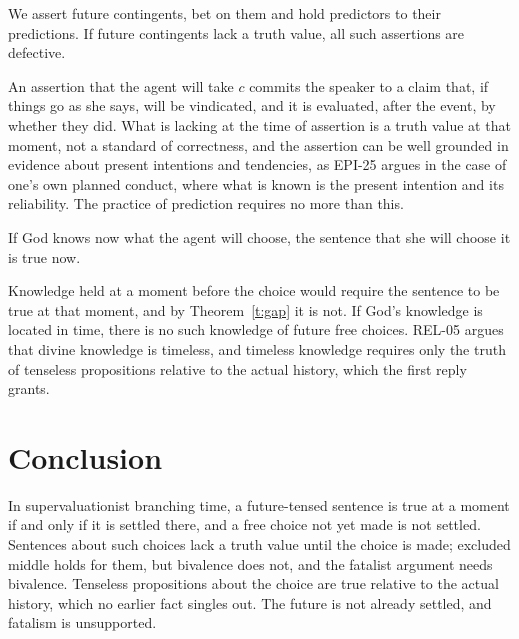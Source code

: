 \documentclass{situationist-preprint}
\begin{document}
\begin{objection}
We assert future contingents, bet on them and hold predictors to their predictions. If future contingents lack a truth value, all such assertions are defective.
\end{objection}

\begin{reply}
An assertion that the agent will take $c$ commits the speaker to a claim that, if things go as she says, will be vindicated, and it is evaluated, after the event, by whether they did. What is lacking at the time of assertion is a truth value at that moment, not a standard of correctness, and the assertion can be well grounded in evidence about present intentions and tendencies, as EPI-25 argues in the case of one's own planned conduct, where what is known is the present intention and its reliability. The practice of prediction requires no more than this.
\end{reply}

\begin{objection}
If God knows now what the agent will choose, the sentence that she will choose it is true now.
\end{objection}

\begin{reply}
Knowledge held at a moment before the choice would require the sentence to be true at that moment, and by Theorem~\ref{t:gap} it is not. If God's knowledge is located in time, there is no such knowledge of future free choices. REL-05 argues that divine knowledge is timeless, and timeless knowledge requires only the truth of tenseless propositions relative to the actual history, which the first reply grants.
\end{reply}

\section{Conclusion}

In supervaluationist branching time, a future-tensed sentence is true at a moment if and only if it is settled there, and a free choice not yet made is not settled. Sentences about such choices lack a truth value until the choice is made; excluded middle holds for them, but bivalence does not, and the fatalist argument needs bivalence. Tenseless propositions about the choice are true relative to the actual history, which no earlier fact singles out. The future is not already settled, and fatalism is unsupported.
\end{document}

